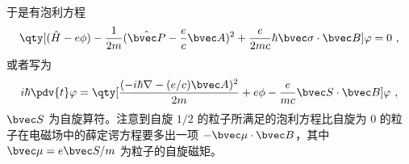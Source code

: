 于是有泡利方程
\begin{equation}
\qty[(\hat H-e\phi)-\frac{1}{2m}(\hat{\bvec P}-\frac{e}{c}\bvec A)^2+\frac{e}{2mc}\hbar\bvec \sigma\cdot \bvec B]\varphi=0~,
\end{equation}
或者写为
\begin{equation}
i\hbar\pdv{t} \varphi = \qty[\frac{(-i\hbar\nabla - (e/c)\bvec A)^2}{2m}+e\phi-\frac{e}{mc}\bvec S\cdot \bvec B]\varphi~,
\end{equation}
$\bvec S$ 为自旋算符。注意到自旋 $1/2$ 的粒子所满足的泡利方程比自旋为 $0$ 的粒子在电磁场中的薛定谔方程要多出一项 $-\bvec \mu\cdot \bvec B$，其中 $\bvec \mu=e\bvec S/m$ 为粒子的自旋磁矩。
